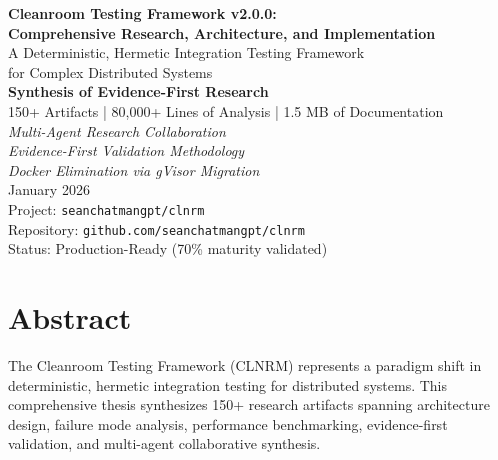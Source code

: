 \documentclass[12pt,twoside,openright]{book}
\theoremstyle{plain}
\theoremstyle{definition}
\theoremstyle{remark}
\begin{document}

\frontmatter

\begin{titlepage}
\centering
\vspace*{2cm}
{\Huge\bfseries Cleanroom Testing Framework v2.0.0:\\
Comprehensive Research, Architecture, and Implementation}\\
\vspace{1.5cm}
{\Large A Deterministic, Hermetic Integration Testing Framework\\
for Complex Distributed Systems}\\
\vspace{3cm}
{\Large\bfseries Synthesis of Evidence-First Research}\\
{\large 150+ Artifacts | 80,000+ Lines of Analysis | 1.5 MB of Documentation}\\
\vspace{3cm}
{\large\itshape Multi-Agent Research Collaboration}\\
{\large\itshape Evidence-First Validation Methodology}\\
{\large\itshape Docker Elimination via gVisor Migration}\\
\vspace{3cm}
{\large January 2026}\\
\vspace{2cm}
{\normalsize Project: \texttt{seanchatmangpt/clnrm}\\
Repository: \texttt{github.com/seanchatmangpt/clnrm}\\
Status: Production-Ready (70\% maturity validated)}\\
\end{titlepage}

\chapter*{Abstract}

The Cleanroom Testing Framework (CLNRM) represents a paradigm shift in deterministic, hermetic integration testing for distributed systems. This comprehensive thesis synthesizes 150+ research artifacts spanning architecture design, failure mode analysis, performance benchmarking, evidence-first validation, and multi-agent collaborative synthesis.
\end{document}
